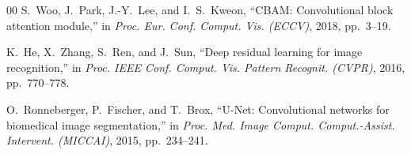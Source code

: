 \documentclass[3p,twocolumn]{elsarticle}
\begin{document}
\begin{thebibliography}{00}
S.~Woo, J.~Park, J.-Y.~Lee, and I.~S.~Kweon, ``CBAM: Convolutional block attention module,'' in \textit{Proc. Eur. Conf. Comput. Vis. (ECCV)}, 2018, pp.~3--19.

K.~He, X.~Zhang, S.~Ren, and J.~Sun, ``Deep residual learning for image recognition,'' in \textit{Proc. IEEE Conf. Comput. Vis. Pattern Recognit. (CVPR)}, 2016, pp.~770--778.

O.~Ronneberger, P.~Fischer, and T.~Brox, ``U-Net: Convolutional networks for biomedical image segmentation,'' in \textit{Proc. Med. Image Comput. Comput.-Assist. Intervent. (MICCAI)}, 2015, pp.~234--241.

\end{thebibliography}
\end{document}
